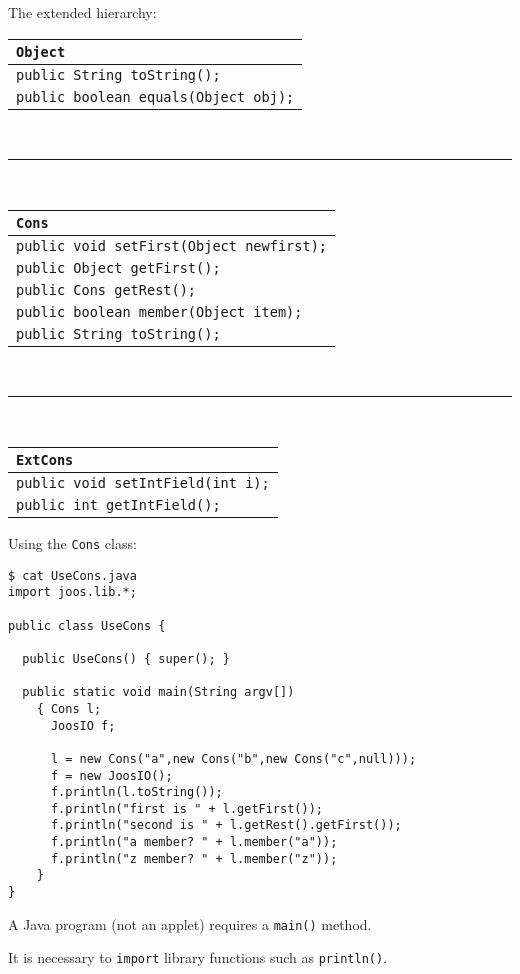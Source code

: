 \begin{slide*}
The extended hierarchy:\\

\begin{scriptsize}
\begin{center}
\begin{tabular}{|l|}
\hline
{\tt Object}\\\hline
{\tt public String toString();}\\
{\tt public boolean equals(Object obj);}\\\hline
\end{tabular}\\
\rule{3pt}{4ex}\\
\begin{tabular}{|l|}
\hline
{\tt Cons}\\\hline
{\tt public void setFirst(Object newfirst);}\\
{\tt public Object getFirst();}\\
{\tt public Cons getRest();}\\
{\tt public boolean member(Object item);}\\
{\tt public String toString();}\\\hline
\end{tabular}\\
\rule{3pt}{4ex}\\
\begin{tabular}{|l|}
\hline
{\tt ExtCons}\\\hline
{\tt public void setIntField(int i);}\\
{\tt public int getIntField();}\\\hline
\end{tabular}
\end{center}
\end{scriptsize}
\vfil
\end{slide*}

\begin{slide*}
Using the {\tt Cons} class:

\begin{scriptsize}
\begin{verbatim}
$ cat UseCons.java
import joos.lib.*;
 
public class UseCons {
 
  public UseCons() { super(); }
 
  public static void main(String argv[])
    { Cons l;
      JoosIO f;
 
      l = new Cons("a",new Cons("b",new Cons("c",null)));
      f = new JoosIO();
      f.println(l.toString());
      f.println("first is " + l.getFirst());
      f.println("second is " + l.getRest().getFirst());
      f.println("a member? " + l.member("a"));
      f.println("z member? " + l.member("z"));
    }
}
\end{verbatim}
\end{scriptsize}

A Java program (not an applet) requires a {\tt main()} method.

It is necessary to {\tt import} library functions such as {\tt println()}.
\vfil
\end{slide*}

